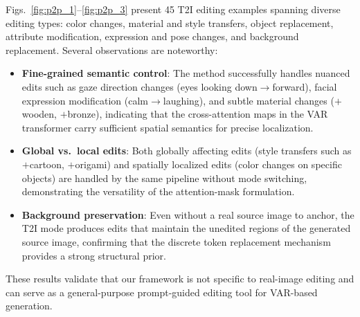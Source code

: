 Figs.~\ref{fig:p2p_1}--\ref{fig:p2p_3} present 45 T2I editing examples spanning diverse editing types: color changes, material and style transfers, object replacement, attribute modification, expression and pose changes, and background replacement. Several observations are noteworthy:

\begin{itemize}
    \item \textbf{Fine-grained semantic control}: The method successfully handles nuanced edits such as gaze direction changes (eyes looking down$\to$forward), facial expression modification (calm$\to$laughing), and subtle material changes ($+$wooden, $+$bronze), indicating that the cross-attention maps in the VAR transformer carry sufficient spatial semantics for precise localization.
    \item \textbf{Global vs.\ local edits}: Both globally affecting edits (style transfers such as $+$cartoon, $+$origami) and spatially localized edits (color changes on specific objects) are handled by the same pipeline without mode switching, demonstrating the versatility of the attention-mask formulation.
    \item \textbf{Background preservation}: Even without a real source image to anchor, the T2I mode produces edits that maintain the unedited regions of the generated source image, confirming that the discrete token replacement mechanism provides a strong structural prior.
\end{itemize}

These results validate that our framework is not specific to real-image editing and can serve as a general-purpose prompt-guided editing tool for VAR-based generation.



